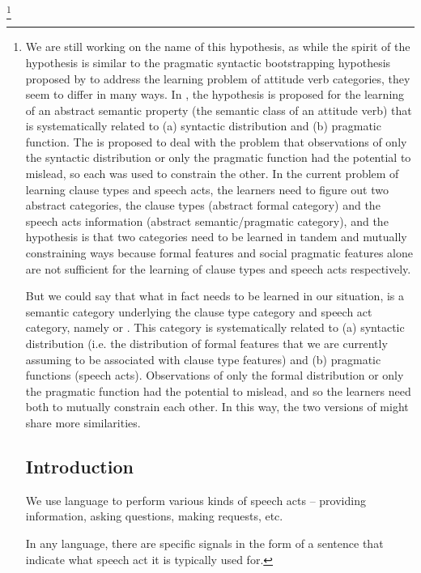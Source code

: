 
\footnote{We are still working on the name of this hypothesis, as while the spirit of the hypothesis is similar to the pragmatic syntactic bootstrapping hypothesis proposed by \textcite{hacquardlidz2018} to address the learning problem of attitude verb categories, they seem to differ in many ways. In \textcite{hacquardlidz2018}, the hypothesis is proposed for the learning of an abstract semantic property (the semantic class of an attitude verb) that is systematically related to (a) syntactic distribution and (b) pragmatic function. The \hypos{} is proposed to deal with the problem that observations of only the syntactic distribution or only the pragmatic function had the potential to mislead, so each was used to constrain the other. In the current problem of learning clause types and speech acts, the learners need to figure out two abstract categories, the clause types (abstract formal category) and the speech acts information (abstract semantic/pragmatic category), and the hypothesis is that two categories need to be learned in tandem and mutually constraining ways because formal features and social pragmatic features alone are not sufficient for the learning of clause types and speech acts respectively. 

But we could say that what in fact needs to be learned in our situation, is a semantic category underlying the clause type category and speech act category, namely  or . This category is systematically related to (a) syntactic distribution (i.e. the distribution of formal features that we are currently assuming to be associated with clause type features) and (b) pragmatic functions (speech acts). Observations of only the formal distribution or only the pragmatic function had the potential to mislead, and so the learners need both to mutually constrain each other. In this way, the two versions of \hypos{} might share more similarities.

\chapter{Introduction}
\label{chap:introduction}
We use language to perform various kinds of speech acts -- providing information, asking questions, making requests, etc. 

In any language, there are specific signals in the form of a sentence that indicate what speech act it is typically used for. 


}
